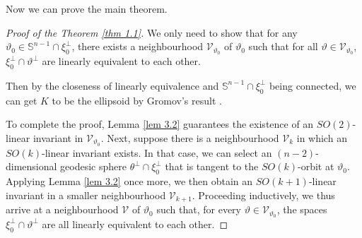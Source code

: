 \documentclass[amsfonts,reqno,11pt]{amsart}
\newcommand{\sphere}{\mathbb{S}^{n-1}}
\begin{document}
Now we can prove the main theorem.
\begin{proof}[Proof of the Theorem \ref{thm 1.1}]
    We only need to show that for any $\vartheta_0\in \sphere\cap\xi_0^\perp$, there exists a neighbourhood $\mathcal{V}_{\vartheta_0}$ of $\vartheta_0$ such that for all $\vartheta\in \mathcal{V}_{\vartheta_0}$, $\xi_0^\perp\cap \vartheta^\perp$ are linearly equivalent to each other.

    Then by the closeness of linearly equivalence and $\sphere\cap \xi_0^\perp$ being connected, we can get $K$ to be the ellipsoid by Gromov's result \cite{Gromov1967}.
    
    To complete the proof, Lemma \ref{lem 3.2} guarantees the existence of an $SO(2)$-linear invariant in $\mathcal{V}_{\vartheta_0}$. Next, suppose there is a neighbourhood $\mathcal{V}_k$ in which an $SO(k)$-linear invariant exists. In that case, we can select an $(n-2)$-dimensional geodesic sphere $\theta^\perp\cap\xi_0^\perp$ that is tangent to the $SO(k)$-orbit at $\vartheta_0$. Applying Lemma \ref{lem 3.2} once more, we then obtain an $SO(k+1)$-linear invariant in a smaller neighbourhood $\mathcal{V}_{k+1}$. Proceeding inductively, we thus arrive at a neighbourhood $\mathcal{V}$ of $\vartheta_0$ such that, for every $\vartheta\in \mathcal{V}_{\vartheta_0}$, the spaces $\xi_0^\perp\cap \vartheta^\perp$ are all linearly equivalent to each other.
\end{proof}

\end{document}
